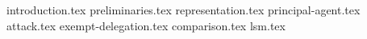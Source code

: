 {introduction.tex}
{preliminaries.tex}
{representation.tex}
{principal-agent.tex}
{attack.tex}
{exempt-delegation.tex}
{comparison.tex}
{lsm.tex}

